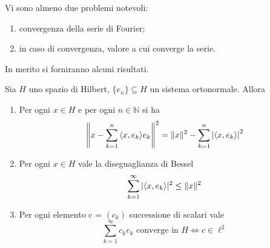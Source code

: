 Vi sono almeno due problemi notevoli: 
\begin{enumerate}[label = --]
    \item convergenza della serie di Fourier;
    \item in caso di convergenza, valore a cui converge la serie.
\end{enumerate}
In merito si forniranno alcuni risultati.
\begin{proposition}\label{prop:bessel}
    Sia \(H\) uno spazio di Hilbert, \(\{e_{n}\} \subseteq H \) un sistema
    ortonormale. Allora
\begin{enumerate}[label = \arabic*.]
    \item Per ogni \(x \in H\) e per ogni \(n \in \mathbb{N}\) si ha
        \begin{equation}\label{eq:bessel1}
          \left\|x - \sum_{k=1}^{n} {\left\langle x, e_{k}\right\rangle} e_{k} \right\|^2 =
          \|x\|^2 - \sum_{k=1}^{n} \left| {\left\langle x, e_{k}\right\rangle}  \right|^2 
        \end{equation}
    \item Per ogni \(x \in H\) vale la diseguaglianza di Bessel
        \begin{equation}\label{eq:bessel}
          \sum_{k=1}^{\infty} |{\left\langle x, e_{k}\right\rangle} |^2 \le \|x\|^2 
        \end{equation}
    \item Per ogni elemento c = \({(c_{k})}\) successione di scalari vale
        \begin{equation}\label{eq:bessel3}
            \sum_{k=1}^{\infty} c_{k} e_{k} \text{ converge in } H \iff c \in
            \ell^2
        \end{equation}
\end{enumerate}
\end{proposition}

